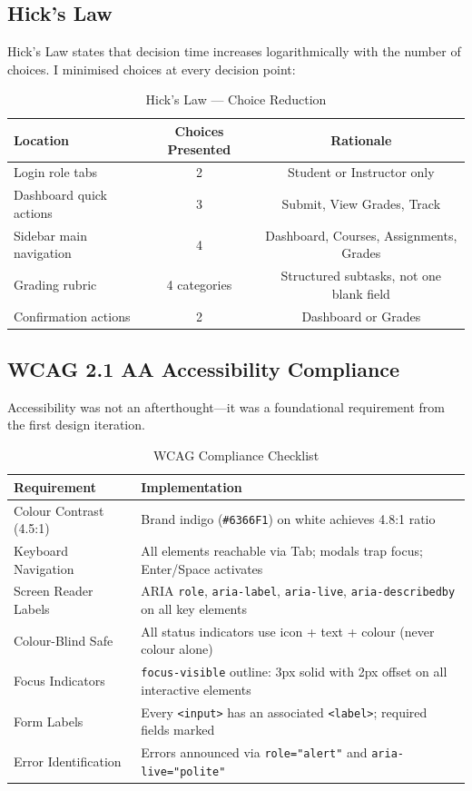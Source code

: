 \documentclass[12pt, a4paper]{article}
\begin{document}
\subsection{Hick's Law}

Hick's Law states that decision time increases logarithmically with the number of choices. I minimised choices at every decision point:

\begin{table}[H]
\centering
\caption{Hick's Law — Choice Reduction}
\begin{tabular}{@{}lcc@{}}
\toprule
\textbf{Location} & \textbf{Choices Presented} & \textbf{Rationale} \\
\midrule
Login role tabs & 2 & Student or Instructor only \\
Dashboard quick actions & 3 & Submit, View Grades, Track \\
Sidebar main navigation & 4 & Dashboard, Courses, Assignments, Grades \\
Grading rubric & 4 categories & Structured subtasks, not one blank field \\
Confirmation actions & 2 & Dashboard or Grades \\
\bottomrule
\end{tabular}
\end{table}

\subsection{WCAG 2.1 AA Accessibility Compliance}

Accessibility was not an afterthought—it was a foundational requirement from the first design iteration.

\begin{table}[H]
\centering
\caption{WCAG Compliance Checklist}
\begin{tabular}{@{}p{4cm}p{8.5cm}@{}}
\toprule
\textbf{Requirement} & \textbf{Implementation} \\
\midrule
Colour Contrast (4.5:1) & Brand indigo (\texttt{\#6366F1}) on white achieves 4.8:1 ratio \\
Keyboard Navigation & All elements reachable via Tab; modals trap focus; Enter/Space activates \\
Screen Reader Labels & ARIA \texttt{role}, \texttt{aria-label}, \texttt{aria-live}, \texttt{aria-describedby} on all key elements \\
Colour-Blind Safe & All status indicators use icon + text + colour (never colour alone) \\
Focus Indicators & \texttt{focus-visible} outline: 3px solid with 2px offset on all interactive elements \\
Form Labels & Every \texttt{<input>} has an associated \texttt{<label>}; required fields marked \\
Error Identification & Errors announced via \texttt{role="alert"} and \texttt{aria-live="polite"} \\
\bottomrule
\end{tabular}
\end{table}
\end{document}
